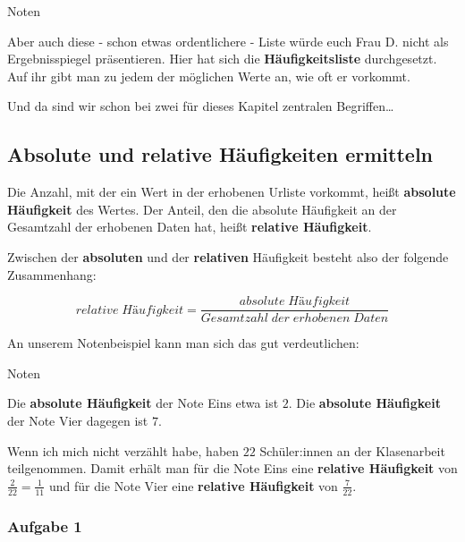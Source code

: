 \documentclass[
  ngerman,
]{book}
\begin{document}
Noten

Aber auch diese - schon etwas ordentlichere - Liste würde euch Frau D. nicht als Ergebnisspiegel präsentieren. Hier hat sich die \textbf{Häufigkeitsliste} durchgesetzt. Auf ihr gibt man zu jedem der möglichen Werte an, wie oft er vorkommt.

Und da sind wir schon bei zwei für dieses Kapitel zentralen Begriffen\ldots{}

\hypertarget{absolute-und-relative-huxe4ufigkeiten-ermitteln}{%
\subsection*{Absolute und relative Häufigkeiten ermitteln}\label{absolute-und-relative-huxe4ufigkeiten-ermitteln}}

Die Anzahl, mit der ein Wert in der erhobenen Urliste vorkommt, heißt \textbf{absolute Häufigkeit} des Wertes. Der Anteil, den die absolute Häufigkeit an der Gesamtzahl der erhobenen Daten hat, heißt \textbf{relative Häufigkeit}.

Zwischen der \textbf{absoluten} und der \textbf{relativen} Häufigkeit besteht also der folgende Zusammenhang:

\[relative \; Häufigkeit = \frac{absolute \; Häufigkeit}{Gesamtzahl\; der\; erhobenen\; Daten}\]

An unserem Notenbeispiel kann man sich das gut verdeutlichen:

Noten

Die \textbf{absolute Häufigkeit} der Note Eins etwa ist \(2\). Die \textbf{absolute Häufigkeit} der Note Vier dagegen ist \(7\).

Wenn ich mich nicht verzählt habe, haben \(22\) Schüler:innen an der Klasenarbeit teilgenommen. Damit erhält man für die Note Eins eine \textbf{relative Häufigkeit} von \(\frac{2}{22} = \frac{1}{11}\) und für die Note Vier eine \textbf{relative Häufigkeit} von \(\frac{7}{22}\).

\hypertarget{section-7}{%
\subsubsection*{}\label{section-7}}

\hypertarget{aufgabe-1-1}{%
\subsubsection*{Aufgabe 1}\label{aufgabe-1-1}}
\end{document}
